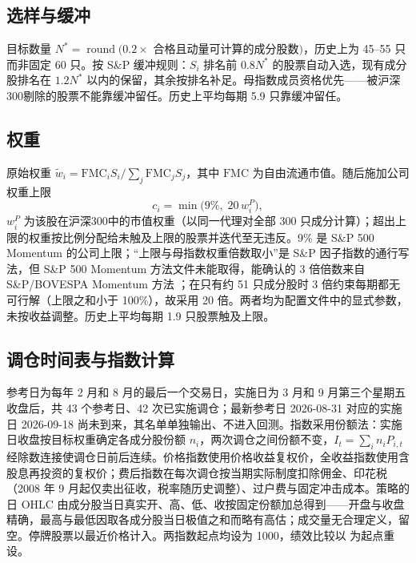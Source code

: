 \documentclass[11pt,a4paper]{article}
\newcommand{\FMC}{\mathrm{FMC}}
\begin{document}
\subsection{选样与缓冲}
目标数量 $N^\ast = \operatorname{round}(0.2\times$ 合格且动量可计算的成分股数$)$，历史上为 45--55 只而非固定 60 只。按 S\&P 缓冲规则：$S_i$ 排名前 $0.8N^\ast$ 的股票自动入选，现有成分股排名在 $1.2N^\ast$ 以内的保留，其余按排名补足。母指数成员资格优先——被沪深300剔除的股票不能靠缓冲留任。历史上平均每期 5.9 只靠缓冲留任。
\FloatBarrier
\subsection{权重}
原始权重 $\tilde w_i = \FMC_i S_i / \sum_j \FMC_j S_j$，其中 $\FMC$ 为自由流通市值。随后施加公司权重上限\begin{equation} c_i = \min\bigl(9\%,\; 20\, w^{P}_i\bigr),\end{equation}$w^P_i$ 为该股在沪深300中的市值权重（以同一代理对全部 300 只成分计算）；超出上限的权重按比例分配给未触及上限的股票并迭代至无违反。9\% 是 S\&P 500 Momentum 的公司上限；“上限与母指数权重倍数取小”是 S\&P 因子指数的通行写法，但 S\&P 500 Momentum 方法文件未能取得，能确认的 3 倍倍数来自 S\&P/BOVESPA Momentum 方法 \cite{spdji_bovespa}；在只有约 51 只成分股时 3 倍约束每期都无可行解（上限之和小于 100\%），故采用 20 倍。两者均为配置文件中的显式参数，未按收益调整。历史上平均每期 1.9 只股票触及上限。
\FloatBarrier
\subsection{调仓时间表与指数计算}
参考日为每年 2 月和 8 月的最后一个交易日，实施日为 3 月和 9 月第三个星期五收盘后，共 43 个参考日、42 次已实施调仓；最新参考日 2026-08-31 对应的实施日 2026-09-18 尚未到来，其名单单独输出、不进入回测。指数采用份额法：实施日收盘按目标权重确定各成分股份额 $n_i$，两次调仓之间份额不变，$I_t = \sum_i n_i P_{i,t}$ 经除数连接使调仓日前后连续。价格指数使用价格收益复权价，全收益指数使用含股息再投资的复权价；费后指数在每次调仓按当期实际制度扣除佣金、印花税（2008 年 9 月起仅卖出征收，税率随历史调整）、过户费与固定冲击成本。策略的日 OHLC 由成分股当日真实开、高、低、收按固定份额加总得到——开盘与收盘精确，最高与最低因取各成分股当日极值之和而略有高估；成交量无合理定义，留空。停牌股票以最近价格计入。两指数起点均设为 1000，绩效比较以  为起点重设。
\FloatBarrier
\end{document}
